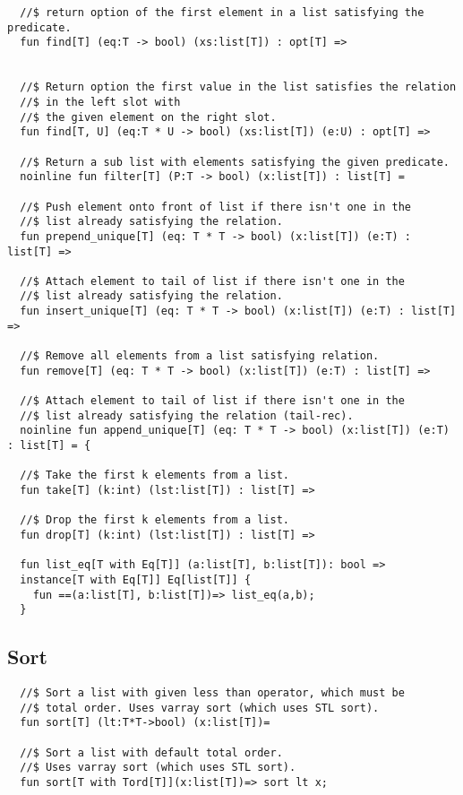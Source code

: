 \documentclass[oneside]{book}
\begin{document}
\begin{verbatim}
  //$ return option of the first element in a list satisfying the predicate.
  fun find[T] (eq:T -> bool) (xs:list[T]) : opt[T] =>


  //$ Return option the first value in the list satisfies the relation 
  //$ in the left slot with 
  //$ the given element on the right slot.
  fun find[T, U] (eq:T * U -> bool) (xs:list[T]) (e:U) : opt[T] =>

  //$ Return a sub list with elements satisfying the given predicate.
  noinline fun filter[T] (P:T -> bool) (x:list[T]) : list[T] =

  //$ Push element onto front of list if there isn't one in the
  //$ list already satisfying the relation.
  fun prepend_unique[T] (eq: T * T -> bool) (x:list[T]) (e:T) : list[T] =>

  //$ Attach element to tail of list if there isn't one in the
  //$ list already satisfying the relation.
  fun insert_unique[T] (eq: T * T -> bool) (x:list[T]) (e:T) : list[T] =>

  //$ Remove all elements from a list satisfying relation.
  fun remove[T] (eq: T * T -> bool) (x:list[T]) (e:T) : list[T] =>

  //$ Attach element to tail of list if there isn't one in the
  //$ list already satisfying the relation (tail-rec).
  noinline fun append_unique[T] (eq: T * T -> bool) (x:list[T]) (e:T) : list[T] = {

  //$ Take the first k elements from a list.
  fun take[T] (k:int) (lst:list[T]) : list[T] =>

  //$ Drop the first k elements from a list.
  fun drop[T] (k:int) (lst:list[T]) : list[T] =>
 
  fun list_eq[T with Eq[T]] (a:list[T], b:list[T]): bool =>
  instance[T with Eq[T]] Eq[list[T]] { 
    fun ==(a:list[T], b:list[T])=> list_eq(a,b); 
  } 
\end{verbatim}
 
\subsection{Sort}
\begin{verbatim}
  //$ Sort a list with given less than operator, which must be
  //$ total order. Uses varray sort (which uses STL sort).
  fun sort[T] (lt:T*T->bool) (x:list[T])=

  //$ Sort a list with default total order.
  //$ Uses varray sort (which uses STL sort).
  fun sort[T with Tord[T]](x:list[T])=> sort lt x;
\end{verbatim}
    
\end{document}
